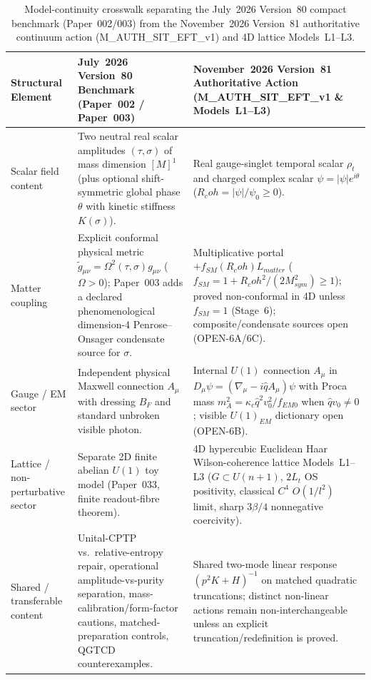 \documentclass[american,11pt,letterpaper]{article}
\newcommand{\Rcoh}{R_{\mathrm{coh}}}
\def\mathcal#1{#1}%
\def\mathrm#1{#1}%
\def\texttt#1{#1}%
\def\Rcoh{R_coh}%
\begin{document}
\begin{table}[htbp]
\centering
\caption{Model-continuity crosswalk separating the July~2026 Version~80 compact benchmark (Paper~002/003) from the November~2026 Version~81 authoritative continuum action (\texttt{M\_AUTH\_SIT\_EFT\_v1}) and 4D lattice Models~L1--L3.}
\label{tab:july-v80-vs-nov-v81}
\vspace{0.35em}
\footnotesize
\begin{tabular}{|p{2.7cm}|p{5.8cm}|p{6.2cm}|}
\hline
\textbf{Structural Element} & \textbf{July~2026 Version~80 Benchmark (Paper~002 / Paper~003)} & \textbf{November~2026 Version~81 Authoritative Action (\texttt{M\_AUTH\_SIT\_EFT\_v1} \& Models~L1--L3)} \\
\hline
Scalar field content & Two neutral real scalar amplitudes $(\tau, \sigma)$ of mass dimension $[M]^1$ (plus optional shift-symmetric global phase $\theta$ with kinetic stiffness $K(\sigma)$). & Real gauge-singlet temporal scalar $\rho_t$ and charged complex scalar $\psi = |\psi|e^{i\theta}$ ($\Rcoh = |\psi|/\psi_0 \ge 0$). \\
\hline
Matter coupling & Explicit conformal physical metric $\tilde{g}_{\mu\nu} = \Omega^2(\tau,\sigma)g_{\mu\nu}$ ($\Omega > 0$); Paper~003 adds a declared phenomenological dimension-4 Penrose--Onsager condensate source for $\sigma$. & Multiplicative portal $+f_{\mathrm{SM}}(\Rcoh)\mathcal{L}_{\mathrm{matter}}$ ($f_{\mathrm{SM}} = 1 + \Rcoh^2/(2M_{\mathrm{sym}}^2) \ge 1$); proved non-conformal in 4D unless $f_{\mathrm{SM}} = 1$ (Stage~6); composite/condensate sources open (\texttt{OPEN-6A}/\texttt{6C}). \\
\hline
Gauge / EM sector & Independent physical Maxwell connection $A_\mu$ with dressing $B_F$ and standard unbroken visible photon. & Internal $U(1)$ connection $A_\mu$ in $D_\mu\psi = (\nabla_\mu - i\hat{q}A_\mu)\psi$ with Proca mass $m_A^2 = \kappa_c\hat{q}^2 v_0^2/f_{\mathrm{EM}0}$ when $\hat{q}v_0 \ne 0$; visible $U(1)_{\mathrm{EM}}$ dictionary open (\texttt{OPEN-6B}). \\
\hline
Lattice / non-perturbative sector & Separate 2D finite abelian $U(1)$ toy model (Paper~033, finite readout-fibre theorem). & 4D hypercubic Euclidean Haar Wilson-coherence lattice Models~L1--L3 ($G \subset U(n+1)$, $2L_t$ OS positivity, classical $C^4$ $O(1/l^2)$ limit, sharp $3\beta/4$ nonnegative coercivity). \\
\hline
Shared / transferable content & Unital-CPTP vs.\ relative-entropy repair, operational amplitude-vs-purity separation, mass-calibration/form-factor cautions, matched-preparation controls, QGTCD counterexamples. & Shared two-mode linear response $(p^2 K + H)^{-1}$ on matched quadratic truncations; distinct non-linear actions remain non-interchangeable unless an explicit truncation/redefinition is proved. \\
\hline
\end{tabular}
\end{table}
\end{document}
